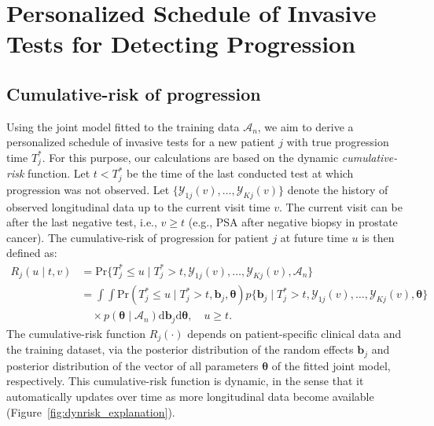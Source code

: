 \documentclass[useAMS, usenatbib, referee]{biom}
\begin{document}
\section{Personalized Schedule of Invasive Tests for Detecting Progression} 
\label{sec:schedule}

\subsection{Cumulative-risk of progression} 
\label{subsec:cum_risk}
Using the joint model fitted to the training data $\mathcal{A}_n$, we aim to derive a personalized schedule of invasive tests for a new patient $j$ with true progression time $T^*_j$. For this purpose, our calculations are based on the dynamic \emph{cumulative-risk} function. Let $t < T^*_j$ be the time of the last conducted test at which progression was not observed. Let $\{\mathcal{Y}_{1j}(v), \ldots, \mathcal{Y}_{Kj}(v)\}$ denote the history of observed longitudinal data up to the current visit time $v$. The current visit can be after the last negative test, i.e., $v \geq t$ (e.g., PSA after negative biopsy in prostate cancer). The cumulative-risk of progression for patient $j$ at future time $u$ is then defined as:
\begin{equation}
\label{eq:cumulative_risk}
\begin{split}
R_j(u \mid t, v) &= \mbox{Pr}\big\{T^*_j \leq u \mid T^*_j > t, \mathcal{Y}_{1j}(v), \ldots, \mathcal{Y}_{Kj}(v), \mathcal{A}_n\big\}\\
&=\int \int \mbox{Pr}(T^*_j \leq u \mid T^*_j > t, \boldsymbol{b}_{j}, \boldsymbol{\theta}) p\big\{\boldsymbol{b}_j \mid T^*_j > t, \mathcal{Y}_{1j}(v), \ldots, \mathcal{Y}_{Kj}(v), \boldsymbol{\theta} \big\}\\
&\quad \times p(\boldsymbol{\theta} \mid \mathcal{A}_n) \mathrm{d}\boldsymbol{b}_j \mathrm{d}\boldsymbol{\theta}, \quad u \geq t.
\end{split}
\end{equation}
The cumulative-risk function $R_j(\cdot)$ depends on patient-specific clinical data and the training dataset, via the posterior distribution of the random effects $\boldsymbol{b}_{j}$ and posterior distribution of the vector of all parameters $\boldsymbol{\theta}$ of the fitted joint model, respectively. This cumulative-risk function is dynamic, in the sense that it automatically updates over time as more longitudinal data become available (Figure~\ref{fig:dynrisk_explanation}).
\end{document}
